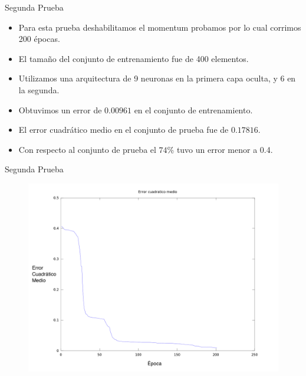 \documentclass{beamer}
\begin{document}
\begin{frame}{Segunda Prueba}
\begin{itemize}
\item Para esta prueba deshabilitamos el momentum probamos por lo cual corrimos 200 épocas.
\item El tamaño del conjunto de entrenamiento fue de 400 elementos.
\item Utilizamos una arquitectura de 9 neuronas en la primera capa oculta, y 6 en la segunda.
\item Obtuvimos un error de $0.00961$ en el conjunto de entrenamiento. 
\item El error cuadrático medio en el conjunto de prueba fue de $0.17816$.
\item Con respecto al conjunto de prueba el $74$\% tuvo un error menor a 0.4.
\end{itemize}
\end{frame}
\begin{frame}{Segunda Prueba}
\begin{figure}[H]
\begin{center}
\includegraphics[scale=0.20]{images/t3-10/ecm.png}
\label{modelado}
\end{center}
\end{figure}
\end{frame}
\end{document}
